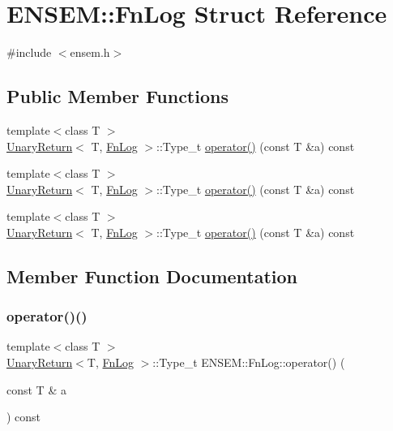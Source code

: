 \hypertarget{structENSEM_1_1FnLog}{}\section{E\+N\+S\+EM\+:\+:Fn\+Log Struct Reference}
\label{structENSEM_1_1FnLog}


{\ttfamily \#include $<$ensem.\+h$>$}

\subsection*{Public Member Functions}
\begin{DoxyCompactItemize}
\item 
{\footnotesize template$<$class T $>$ }\\\mbox{\hyperlink{structENSEM_1_1UnaryReturn}{Unary\+Return}}$<$ T, \mbox{\hyperlink{structENSEM_1_1FnLog}{Fn\+Log}} $>$\+::Type\+\_\+t \mbox{\hyperlink{structENSEM_1_1FnLog_a11b3aaca4dd06198708ed986afc66ba7}{operator()}} (const T \&a) const
\item 
{\footnotesize template$<$class T $>$ }\\\mbox{\hyperlink{structENSEM_1_1UnaryReturn}{Unary\+Return}}$<$ T, \mbox{\hyperlink{structENSEM_1_1FnLog}{Fn\+Log}} $>$\+::Type\+\_\+t \mbox{\hyperlink{structENSEM_1_1FnLog_a11b3aaca4dd06198708ed986afc66ba7}{operator()}} (const T \&a) const
\item 
{\footnotesize template$<$class T $>$ }\\\mbox{\hyperlink{structENSEM_1_1UnaryReturn}{Unary\+Return}}$<$ T, \mbox{\hyperlink{structENSEM_1_1FnLog}{Fn\+Log}} $>$\+::Type\+\_\+t \mbox{\hyperlink{structENSEM_1_1FnLog_a11b3aaca4dd06198708ed986afc66ba7}{operator()}} (const T \&a) const
\end{DoxyCompactItemize}


\subsection{Member Function Documentation}
\mbox{\label{structENSEM_1_1FnLog_a11b3aaca4dd06198708ed986afc66ba7}} 
\subsubsection{\texorpdfstring{operator()()}{operator()()}\hspace{0.1cm}{\footnotesize\ttfamily [1/3]}}
{\footnotesize\ttfamily template$<$class T $>$ \\
\mbox{\hyperlink{structENSEM_1_1UnaryReturn}{Unary\+Return}}$<$T, \mbox{\hyperlink{structENSEM_1_1FnLog}{Fn\+Log}} $>$\+::Type\+\_\+t E\+N\+S\+E\+M\+::\+Fn\+Log\+::operator() (\begin{DoxyParamCaption}\item[{const T \&}]{a }\end{DoxyParamCaption}) const\hspace{0.3cm}{\ttfamily [inline]}}

